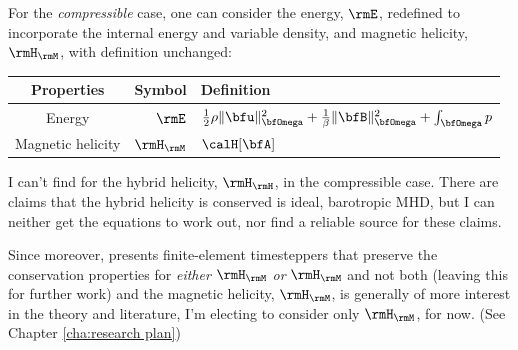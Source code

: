     For the \emph{compressible} case, one can consider the energy, $\rmE$, redefined to incorporate the internal energy and variable density, and magnetic helicity, $\rmH_{\rmM}$, with definition unchanged:
    \begin{center}\begin{tabular}{ c | r : l }
        Properties  &  Symbol  &  Definition  \\
        \hline\hline
        Energy  &  $\rmE$  &  $\frac{1}{2}\rho\|\bfu\|_{\bfOmega}^{2} + \frac{1}{\beta}\|\bfB\|_{\bfOmega}^{2} + \int_{\bfOmega}p$  \\
        \hdashline
        Magnetic helicity  &  $\rmH_{\rmM}$  &  $\calH[\bfA]$
    \end{tabular}\end{center}

    \begin{remark}
        I can't find for the hybrid helicity, $\rmH_{\rmH}$, in the compressible case. There are claims that the hybrid helicity is conserved is ideal, barotropic MHD, but I can neither get the equations to work out, nor find a reliable source for these claims.
        
        Since moreover, \cite{Laakmann_Hu_Farrell_2022} presents finite-element timesteppers that preserve the conservation properties for \emph{either} $\rmH_{\rmM}$ \emph{or} $\rmH_{\rmM}$ and not both (leaving this for further work) and the magnetic helicity, $\rmH_{\rmM}$, is generally of more interest in the theory and literature, I'm electing to consider only $\rmH_{\rmM}$, for now. (See Chapter \ref{cha:research plan})
    \end{remark}

